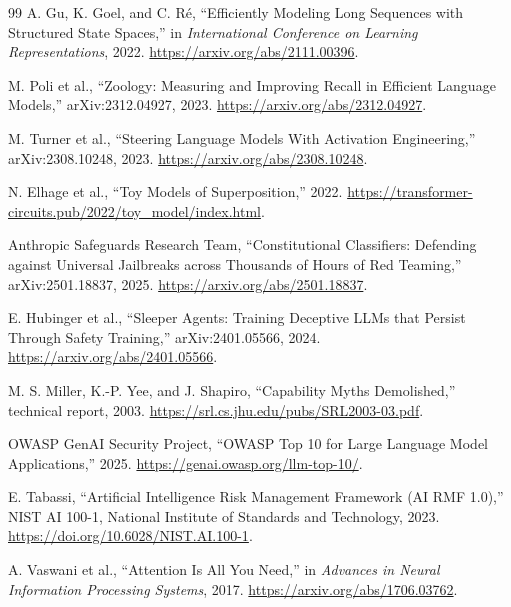 \documentclass[11pt]{article}
\newcommand{\1}{\mathbf{1}}
\begin{document}
\begin{thebibliography}{99}
A. Gu, K. Goel, and C. Ré, ``Efficiently Modeling Long Sequences with Structured State Spaces,'' in \emph{International Conference on Learning Representations}, 2022. \url{https://arxiv.org/abs/2111.00396}.

M. Poli et al., ``Zoology: Measuring and Improving Recall in Efficient Language Models,'' arXiv:2312.04927, 2023. \url{https://arxiv.org/abs/2312.04927}.

M. Turner et al., ``Steering Language Models With Activation Engineering,'' arXiv:2308.10248, 2023. \url{https://arxiv.org/abs/2308.10248}.

N. Elhage et al., ``Toy Models of Superposition,'' 2022. \url{https://transformer-circuits.pub/2022/toy\_model/index.html}.

Anthropic Safeguards Research Team, ``Constitutional Classifiers: Defending against Universal Jailbreaks across Thousands of Hours of Red Teaming,'' arXiv:2501.18837, 2025. \url{https://arxiv.org/abs/2501.18837}.

E. Hubinger et al., ``Sleeper Agents: Training Deceptive LLMs that Persist Through Safety Training,'' arXiv:2401.05566, 2024. \url{https://arxiv.org/abs/2401.05566}.

M. S. Miller, K.-P. Yee, and J. Shapiro, ``Capability Myths Demolished,'' technical report, 2003. \url{https://srl.cs.jhu.edu/pubs/SRL2003-03.pdf}.

OWASP GenAI Security Project, ``OWASP Top 10 for Large Language Model Applications,'' 2025. \url{https://genai.owasp.org/llm-top-10/}.

E. Tabassi, ``Artificial Intelligence Risk Management Framework (AI RMF 1.0),'' NIST AI 100-1, National Institute of Standards and Technology, 2023. \url{https://doi.org/10.6028/NIST.AI.100-1}.

A. Vaswani et al., ``Attention Is All You Need,'' in \emph{Advances in Neural Information Processing Systems}, 2017. \url{https://arxiv.org/abs/1706.03762}.
\end{thebibliography}
\end{document}
